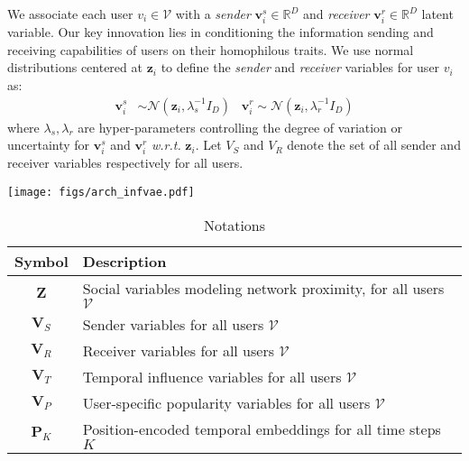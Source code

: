 \documentclass[sigconf]{acmart}
\newcommand{\name}{Inf-VAE}
\def\rvv{{\mathbf{v}}}
\def\rvz{{\mathbf{z}}}
\def\mP{{\bm{P}}}
\def\mV{{\bm{V}}}
\def\mZ{{\bm{Z}}}
\def\gN{{\mathcal{N}}}
\def\gV{{\mathcal{V}}}
\def\sR{{\mathbb{R}}}
\begin{document}
We associate each user $v_i \in \gV$ with a \textit{sender} $\rvv^{s}_i \in \sR^{D}$ and \textit{receiver} $\rvv^{r}_i \in \sR^{D}$ latent variable.
Our key innovation lies in conditioning the information sending and receiving capabilities of users on their homophilous traits.
We use normal distributions centered at $\rvz_i$ 
to define the \emph{sender} and \emph{receiver} variables for user $v_i$ as: 
\begin{align}
\rvv^{s}_i &\sim \gN (\mathbf{z}_i, \lambda_s^{-1} I_D) \hspace{10pt} \rvv^{r}_i \sim \gN (\mathbf{z}_i , \lambda_r^{-1} I_D) 
\end{align}
where $\lambda_s,\lambda_r$ are hyper-parameters controlling the degree of variation or uncertainty for $\rvv^{s}_i$ and $\rvv^{r}_i$ \textit{w.r.t.} $\rvz_i$.
Let $V_S$ and $V_R $ denote the set of all sender and receiver variables respectively for all users.
\begin{figure*}[t]
    \centering
    \texttt{[image: figs/arch\_infvae.pdf]}
    \vspace{-14pt}
    \caption{Neural Architecture of~\name~depicting latent variable interactions. The left side indicates the VAE framework to model social homophily; right side denotes the co-attentive fusion network to integrate the social and temporal variables.}
    \label{fig:arch}
    \vspace{-10pt}
\end{figure*}


\begin{table}[t]
\small
    \centering
    \begin{tabular}{@{}c|l@{}}
    \toprule
        Symbol &  Description \\
        \midrule
         $\mZ$ &  Social variables modeling network proximity, for all users $\gV$ \\
         $\mV_S$ &  Sender variables for all users $\gV$ \\
         $\mV_R$ &  Receiver variables for all users $\gV$ \\
         $\mV_{T}$ & Temporal influence variables for all users $\gV$ \\
         $\mV_{P}$ & User-specific popularity variables for all users $\gV$ \\
         $\mP_K$ & Position-encoded temporal embeddings for all time steps $K$ \\
         \bottomrule
    \end{tabular}
    \caption{Notations}
    \label{tab:notations}
    \vspace{-20pt}
\end{table}
\end{document}
